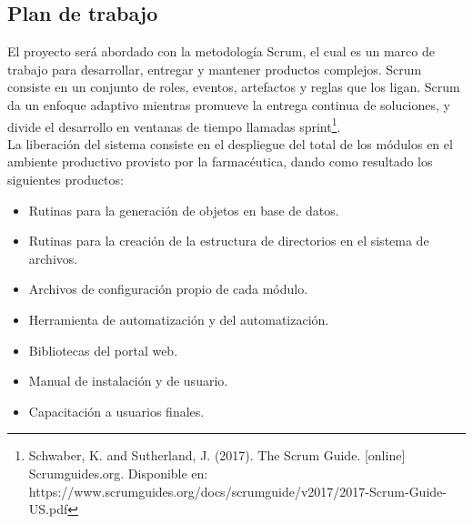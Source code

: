 \documentclass[letterpaper,11pt]{article}
\begin{document}
\subsection{Plan de trabajo}
El proyecto será abordado con la metodología Scrum, el cual es un marco de trabajo para desarrollar, entregar y mantener productos complejos. Scrum consiste en un conjunto de roles, eventos, artefactos y reglas que los ligan. Scrum da un enfoque adaptivo mientras promueve la entrega continua de soluciones, y divide el desarrollo en ventanas de tiempo llamadas sprint\footnote{Schwaber, K. and Sutherland, J. (2017). The Scrum Guide. [online] Scrumguides.org. Disponible en: https://www.scrumguides.org/docs/scrumguide/v2017/2017-Scrum-Guide-US.pdf}.\\
La liberación del sistema consiste en el despliegue del total de los módulos en el ambiente productivo provisto por la farmacéutica,  dando como resultado los siguientes productos:
\begin{itemize}
\item Rutinas para la generación de objetos en base de datos.
\item Rutinas para la creación de la estructura de directorios en el sistema de archivos.
\item Archivos de configuración propio de cada módulo.
\item Herramienta de automatización y del automatización.
\item Bibliotecas del portal web.
\item Manual de instalación y de usuario.
\item Capacitación a usuarios finales.
\end{itemize}
\end{document}
